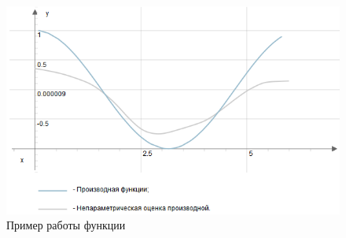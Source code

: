  \begin{figure} [h] 
   \center
   \includegraphics {MHL_NonparametricEstimatorOfDerivative3.png}
   \caption{Пример работы функции} 
   \label{img:MHL_NonparametricEstimatorOfDerivative3}  
 \end{figure}